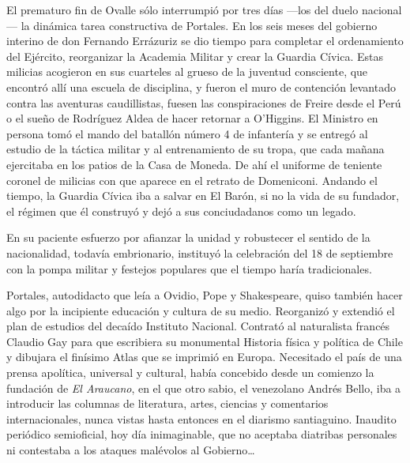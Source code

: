 \documentclass[10pt,twoside,openright]{memoir}
\begin{document}
El prematuro fin de Ovalle sólo interrumpió por tres días ---los del duelo nacional--- la dinámica tarea
constructiva de Portales. En los seis meses del gobierno interino de don
Fernando Errázuriz se dio tiempo para completar el ordenamiento del
Ejército, reorganizar la Academia Militar y crear la Guardia Cívica. Estas milicias acogieron en
sus cuarteles al grueso de la juventud consciente, que encontró allí una
escuela de disciplina, y fueron el muro de contención levantado contra
las aventuras caudillistas, fuesen las conspiraciones de Freire desde el
Perú o el sueño de Rodríguez Aldea de hacer retornar a O'Higgins. El
Ministro en persona tomó el mando del batallón número 4 de infantería y
se entregó al estudio de la táctica militar y al entrenamiento de su
tropa, que cada mañana ejercitaba en los patios de la Casa de Moneda. De
ahí el uniforme de teniente coronel de milicias con que aparece en el
retrato de Domeniconi. Andando el tiempo, la Guardia Cívica iba a salvar
en El Barón, si no la vida de su fundador, el régimen que él construyó y
dejó a sus conciudadanos como un legado.

En su paciente esfuerzo por afianzar la unidad y robustecer el sentido
de la nacionalidad, todavía embrionario, instituyó la celebración del 18
de septiembre con la pompa militar y festejos populares que el tiempo
haría tradicionales.

Portales, autodidacto que leía a Ovidio, Pope y Shakespeare, quiso
también hacer algo por la incipiente educación y cultura de su medio.
Reorganizó y extendió el plan de estudios del decaído Instituto
Nacional. Contrató al naturalista francés Claudio Gay para que escribiera su monumental
Historia física y política de Chile y dibujara el finísimo Atlas que se
imprimió en Europa. Necesitado el país de una prensa apolítica,
universal y cultural, había concebido desde un comienzo la fundación de 
\emph{El Araucano}, en el que otro sabio, el venezolano Andrés Bello, iba a
introducir las columnas de literatura, artes, ciencias y comentarios
internacionales, nunca vistas hasta entonces en el diarismo santiaguino.
Inaudito periódico semioficial, hoy día inimaginable, que no aceptaba
diatribas personales ni contestaba a los ataques malévolos al
Gobierno\ldots
\end{document}
